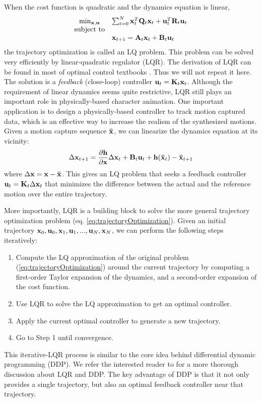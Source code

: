 When the cost function is quadratic and the dynamics equation is linear,
\begin{equation}
  \begin{array}{cl}
    \min_{\vc{x},\vc{u}}&\sum_{t=0}^{N}\vc{x}_t^T\vc{Q}_t\vc{x}_t+\vc{u}_t^T\vc{R}_t\vc{u}_t\\
    \textrm{subject to}&\\
    &\vc{x}_{t+1}=\vc{A}_t\vc{x}_t+\vc{B}_t\vc{u}_t
  \end{array}
  \label{eq:LQR}
\end{equation}
the trajectory optimization is called an LQ problem. This problem can be solved very efficiently by linear-quadratic regulator (LQR). The derivation of LQR can be found in most of optimal control textbooks \cite{todorov2006optimal}. Thus we will not repeat it here. The solution is a \emph{feedback} (close-loop) controller $\mathbf{u}_t=\mathbf{K}_t\mathbf{x}_t$. Although the requirement of linear dynamics seems quite restrictive, LQR still plays an important role in physically-based character animation. One important application is to design a physically-based controller to track motion captured data, which is an effective way to increase the realism of the synthesized motions. Given a motion capture sequence $\mathbf{\bar{x}}$, we can linearize the dynamics equation at its vicinity:
\begin{displaymath}
  \Delta \mathbf{x}_{t+1}=\frac{\partial \mathbf{h}}{\partial \mathbf{x}}\Delta \mathbf{x}_{t}+\mathbf{B}_t\mathbf{u}_t+\mathbf{h}(\mathbf{\bar{x}}_t)-\mathbf{\bar{x}}_{t+1}
  \end{displaymath}
where $\Delta \mathbf{x}=\mathbf{x}-\mathbf{\bar{x}}$. This gives an LQ problem that seeks a feedback controller $\mathbf{u}_t=\mathbf{K}_t\Delta \mathbf{x}_t$ that minimizes the difference between the actual and the reference motion over the entire trajectory.

More importantly, LQR is a building block to solve the more general trajectory optimization problem (eq. \ref{eq:trajectoryOptimization}). Given an initial trajectory $\mathbf{x}_0, \mathbf{u}_0, \mathbf{x}_1, \mathbf{u}_1, ... , \mathbf{u}_N, \mathbf{x}_N$, we can perform the following steps iteratively:
\begin{enumerate}
\item{Compute the LQ approximation of the original problem (\ref{eq:trajectoryOptimization}) around the current trajectory by computing a first-order Taylor expansion of the dynamics, and a second-order expansion of the cost function.}
\item{Use LQR to solve the LQ approximation to get an optimal controller.}
\item{Apply the current optimal controller to generate a new trajectory.}
  \item{Go to Step 1 until convergence.}
\end{enumerate}
This iterative-LQR process is similar to the core idea behind differential dynamic programming (DDP). We refer the interested reader to \citet{todorov2006optimal} for a more thorough discussion about LQR and DDP. The key advantage of DDP is that it not only provides a single trajectory, but also an optimal feedback controller near that trajectory.

